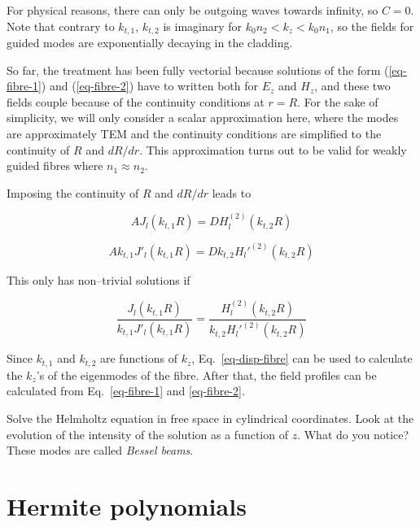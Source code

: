 For physical reasons, there can only be outgoing waves towards infinity, so $C=0$. Note that contrary to $k_{t,1}$, $k_{t,2}$ is imaginary for $k_0 n_2 < k_z < k_0 n_1$, so the fields for guided modes are exponentially decaying in the cladding.

So far, the treatment has been fully vectorial because solutions of the form (\ref{eq-fibre-1}) and (\ref{eq-fibre-2}) have to written both for $E_z$ and $H_z$, and these two fields couple because of the continuity conditions at $r=R$. For the sake of simplicity, we will only consider a scalar approximation here, where the modes are approximately TEM and the continuity conditions are simplified to the continuity of $R$ and $d R / d r$. This approximation turns out to be valid for weakly guided fibres where $n_1 \approx n_2$.

Imposing the continuity of $R$ and $d R / dr$ leads to

\begin{equation}
A J_l\left(k_{t,1}R\right) = D H_l^{(2)}\left(k_{t,2}R\right)
\end{equation} 

\begin{equation}
A k_{t,1} J'_l\left(k_{t,1}R\right) = D k_{t,2} H_l'^{(2)}\left(k_{t,2}R\right)
\end{equation} 

This only has non--trivial solutions if

\begin{equation}
\frac{J_l\left(k_{t,1}R\right)}{k_{t,1} J'_l\left(k_{t,1}R\right)} = \frac{H_l^{(2)}\left(k_{t,2}R\right)}{k_{t,2} H_l'^{(2)}\left(k_{t,2}R\right)} \label{eq-disp-fibre}
\end{equation}

Since $k_{t,1}$ and $k_{t,2}$ are functions of $k_z$, Eq.~\ref{eq-disp-fibre} can be used to calculate the $k_z$'s of the eigenmodes of the fibre. After that, the field profiles can be calculated from Eq.~\ref{eq-fibre-1} and \ref{eq-fibre-2}.

\begin{sidebar}
\begin{ex}
Solve the Helmholtz equation in free space in cylindrical coordinates. Look at the evolution of the intensity of the solution as a function of $z$. What do you notice? These modes are called \emph{Bessel beams}.
\end{ex}
\end{sidebar}

\section{Hermite polynomials}

